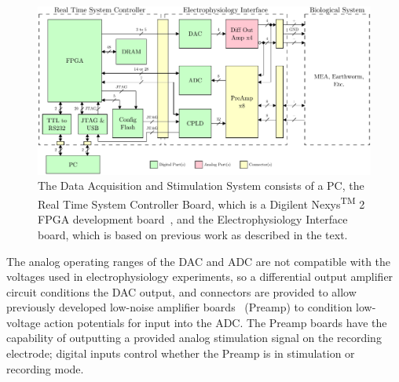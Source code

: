\begin{landscape}
\begin{figure} %
	\begin{singlespace}
	\centering	
		\includegraphics{./figures/System}
	\caption{The Data Acquisition and Stimulation System consists of a PC, the Real Time System Controller Board, which is a Digilent\textsuperscript{\textregistered} Nexys\textsuperscript{TM} 2 FPGA development board~\cite{DigilentNexys2rm,DigilentNexys2sch}, and the Electrophysiology Interface board, which is based on previous work as described in the text.\label{fig:System}}
	\end{singlespace}
\end{figure}
\end{landscape}

The analog operating ranges of the DAC and ADC are not compatible with the voltages used in electrophysiology experiments, so a differential output amplifier circuit conditions the DAC output, and connectors are provided to allow previously developed low-noise amplifier boards~\cite{StahlMSEE} (Preamp) to condition low-voltage action potentials for input into the ADC.  The Preamp boards have the capability of outputting a provided analog stimulation signal on the recording electrode; digital inputs control whether the Preamp is in stimulation or recording mode.

